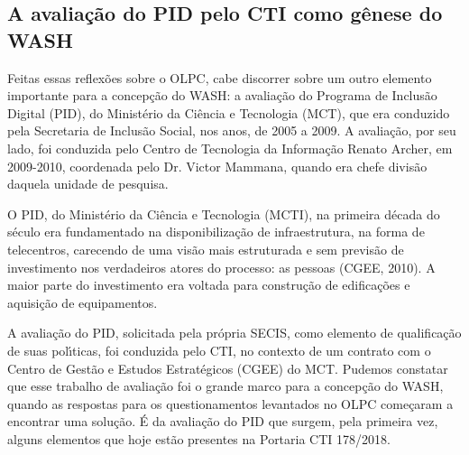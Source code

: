 \documentclass[
12pt,		%
openright,	%
twoside,  %
a4paper,			%
chapter=TITLE,		%
english,			%
french,				%
spanish,			%
brazil				%
]{USPSC-classe/USPSC}
\begin{document}
\subsection[A avalia\c{c}\~ao do PID pelo CTI como g\^enese do WASH]{A avalia\c{c}\~ao do PID pelo CTI como g\^enese do WASH}\label{A avalia\c{c}\~ao do PID pelo CTI como g\^enese do WASH}
Feitas essas reflex\~oes sobre o OLPC, cabe discorrer sobre um outro elemento importante para a concep\c{c}\~ao do WASH: a avalia\c{c}\~ao do Programa de Inclus\~ao Digital (PID), do Minist\'erio da Ci\^encia e Tecnologia (MCT), que era conduzido pela Secretaria de Inclus\~ao Social, nos anos, de 2005 a 2009. A avalia\c{c}\~ao, por seu lado, foi conduzida pelo Centro de Tecnologia da Informa\c{c}\~ao Renato Archer, em 2009-2010, coordenada pelo Dr. Victor Mammana, quando era chefe divis\~ao daquela unidade de pesquisa.

















O PID, do Minist\'erio da Ci\^encia e Tecnologia (MCTI), na primeira d\'ecada do s\'eculo era fundamentado na disponibiliza\c{c}\~ao de infraestrutura, na forma de telecentros, carecendo de uma vis\~ao mais estruturada e sem previs\~ao de investimento nos verdadeiros atores do processo: as pessoas (CGEE, 2010). A maior parte do investimento era voltada para constru\c{c}\~ao de edifica\c{c}\~oes e aquisi\c{c}\~ao de equipamentos.

















A avalia\c{c}\~ao do PID, solicitada pela pr\'opria SECIS, como elemento de qualifica\c{c}\~ao de suas pol\'{\i}ticas, foi conduzida pelo CTI, no contexto de um contrato com o Centro de Gest\~ao e Estudos Estrat\'egicos (CGEE) do MCT. Pudemos constatar que esse trabalho de avalia\c{c}\~ao foi o grande marco para a concep\c{c}\~ao do WASH, quando as respostas para os questionamentos levantados no OLPC come\c{c}aram a encontrar uma solu\c{c}\~ao. \'E da avalia\c{c}\~ao do PID que surgem, pela primeira vez, alguns elementos que hoje est\~ao presentes na Portaria CTI 178/2018.
\end{document}
